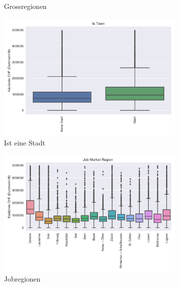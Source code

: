 \begin{figure}[h]
\begin{subfigure}{.5\textwidth}
  \caption{Grossregionen}
\end{subfigure}
\begin{subfigure}{.5\textwidth}
  \centering
  \includegraphics[width=\linewidth]{images/anhang/analysis/boxplot_is_town.png}
  \caption{Ist eine Stadt}
\end{subfigure}
\begin{subfigure}{.5\textwidth}
  \centering
  \includegraphics[width=\linewidth]{images/anhang/analysis/boxplot_job_market_region_id.png}
  \caption{Jobregionen}
\end{subfigure}
\begin{subfigure}{.5\textwidth}
  \centering

\end{subfigure}
\end{figure}
